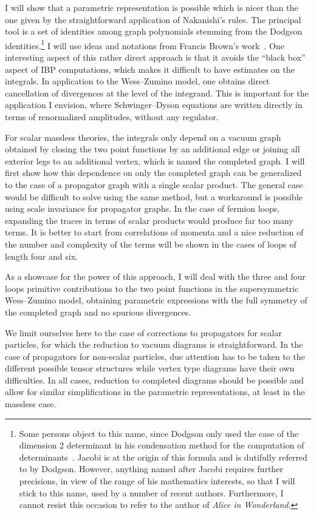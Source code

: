\documentclass[pdftex]{sigma}
\numberwithin{equation}{section}
\begin{document}
I will show that a parametric representation is possible which is nicer than the one given by the straightforward
application of Nakanishi's rules. The principal tool is a set of identities among graph polynomials stemming from
the Dodgson identities.\footnote{Some persons object to this name, since Dodgson only used the case of the dimension 2
determinant in his condensation method for the computation of determinants~\cite{Do1867}. Jacobi is at the origin of this
formula and is dutifully referred to by Dodgson. However, anything named after Jacobi requires further precisions, in
view of the range of his mathematics interests, so that I will stick to this name, used by a number of recent authors.
Furthermore, I cannot resist this occasion to refer to the author of {\em Alice in Wonderland}.}
I will use ideas and notations from Francis Brown's work~\cite{Br2009,BrYe09}. One interesting aspect of this rather direct approach
is that it avoids the ``black box'' aspect of IBP computations, which makes it difficult to have estimates on the integrals.
In application to the Wess--Zumino model, one obtains direct cancellation of divergences at the level of the integrand.
This is important for the application I envision, where Schwinger--Dyson equations are written directly in terms of renormalized amplitudes,
without any regulator.

For scalar massless theories, the integrals only depend on a vacuum
graph obtained by closing the two point functions by an additional edge or joining all
exterior legs to an additional vertex, which is named the completed graph. I will first show how this dependence on only
the completed graph can be generalized to the case of a propagator graph with a single scalar product. The general case
would be difficult to solve using the same method, but a workaround is possible using scale invariance for propagator graphs.
In the case of fermion loops, expanding the traces in terms
of scalar products would produce far too many terms. It is better to start from
correlations of momenta and a nice reduction of the number and complexity of the terms
will be shown in the cases of loops of length four and six.

As a showcase for the power of this approach, I will deal with the
three and four loops primitive contributions to the two point functions in the supersymmetric
Wess--Zumino model, obtaining parametric expressions with the full symmetry of the
completed graph and no spurious divergences.

We limit ourselves here to the case of corrections to propagators for scalar particles, for which the reduction to vacuum diagrams is
straightforward. In the case of propagators for non-scalar particles, due
attention has to be taken to the different possible tensor structures while vertex type diagrams have their own
difficulties. In all cases, reduction to completed diagrams should be possible and allow
for similar simplifications in the parametric representations, at least in the massless case.
\end{document}
